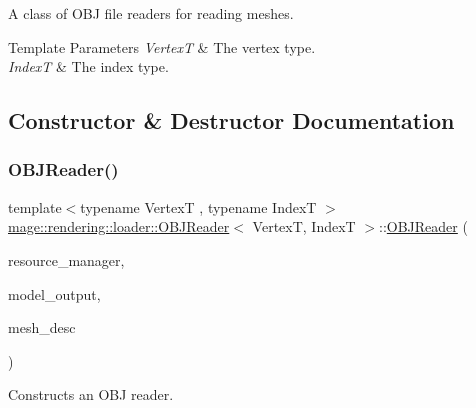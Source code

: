 A class of O\+BJ file readers for reading meshes.


\begin{DoxyTemplParams}{Template Parameters}
{\em VertexT} & The vertex type. \\
\hline
{\em IndexT} & The index type. \\
\hline
\end{DoxyTemplParams}


\subsection{Constructor \& Destructor Documentation}
\hypertarget{classmage_1_1rendering_1_1loader_1_1_o_b_j_reader_a5fe68a545e05c266b69f35e4dc9027a9}{}\label{classmage_1_1rendering_1_1loader_1_1_o_b_j_reader_a5fe68a545e05c266b69f35e4dc9027a9} 
\subsubsection{\texorpdfstring{O\+B\+J\+Reader()}{OBJReader()}\hspace{0.1cm}{\footnotesize\ttfamily [1/3]}}
{\footnotesize\ttfamily template$<$typename VertexT , typename IndexT $>$ \\
\hyperlink{classmage_1_1rendering_1_1loader_1_1_o_b_j_reader}{mage\+::rendering\+::loader\+::\+O\+B\+J\+Reader}$<$ VertexT, IndexT $>$\+::\hyperlink{classmage_1_1rendering_1_1loader_1_1_o_b_j_reader}{O\+B\+J\+Reader} (\begin{DoxyParamCaption}\item[{\hyperlink{classmage_1_1rendering_1_1_resource_manager}{Resource\+Manager} \&}]{resource\+\_\+manager,  }\item[{\hyperlink{structmage_1_1rendering_1_1_model_output}{Model\+Output}$<$ VertexT, IndexT $>$ \&}]{model\+\_\+output,  }\item[{const \hyperlink{classmage_1_1rendering_1_1_mesh_descriptor}{Mesh\+Descriptor}$<$ VertexT, IndexT $>$ \&}]{mesh\+\_\+desc }\end{DoxyParamCaption})\hspace{0.3cm}{\ttfamily [explicit]}}

Constructs an O\+BJ reader.


